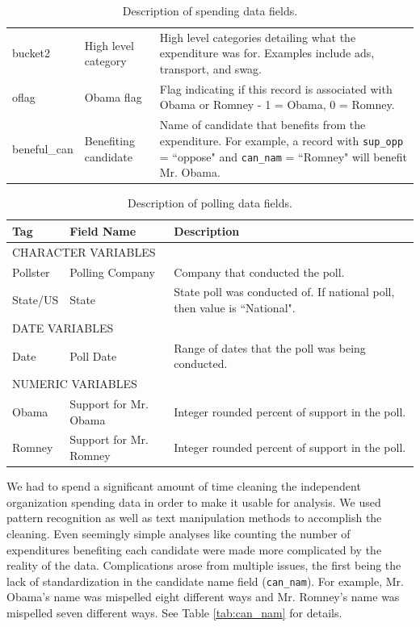 \documentclass[11pt]{article}\usepackage{graphicx, color}
\begin{document}
\begin{table}[h!]
\begin{tabular}[\textwidth]{l l p{}}
bucket2 & High level category & High level categories detailing what the expenditure was for. Examples include ads, transport, and swag.\\
oflag & Obama flag & Flag indicating if this record is associated with Obama or Romney - 1 = Obama, 0 = Romney.\\
beneful\_can & Benefiting candidate & Name of candidate that benefits from the expenditure. For example, a record with \texttt{sup\_opp} = ``oppose" and \texttt{can\_nam} = ``Romney" will benefit Mr. Obama.\\
\end{tabular}
\caption{Description of spending data fields.}
\label{tab:spendData}
\end{table}

\begin{table}[h!]
\begin{tabular}{l p{} p{}}
Tag & Field Name & Description\\
\hline
\hline
\multicolumn{3}{l}{\MakeTextUppercase{Character Variables}}\\
\hline
Pollster & Polling Company & Company that conducted the poll. \\
State/US & State & State poll was conducted of. If national poll, then value is ``National".\\
\hline
\multicolumn{3}{l}{\MakeTextUppercase{Date Variables}}\\
\hline
Date & Poll Date & Range of dates that the poll was being conducted.\\
\hline
\multicolumn{3}{l}{\MakeTextUppercase{Numeric Variables}}\\
\hline
Obama & Support for Mr. Obama & Integer rounded percent of support in the poll. \\
Romney & Support for Mr. Romney & Integer rounded percent of support in the poll.
\end{tabular}
\caption{Description of polling data fields.}
\label{tab:pollData}
\end{table}

We had to spend a significant amount of time cleaning the independent organization spending data in order to make it usable for analysis. We used pattern recognition as well as text manipulation methods to accomplish the cleaning. Even seemingly simple analyses like counting the number of expenditures benefiting each candidate were made more complicated by the reality of the data. Complications arose from multiple issues, the first being the lack of standardization in the candidate name field (\texttt{can\_nam}). For example, Mr. Obama's name was mispelled eight different ways and Mr. Romney's name was mispelled seven different ways. See Table \ref{tab:can_nam} for details. 
\end{document}
